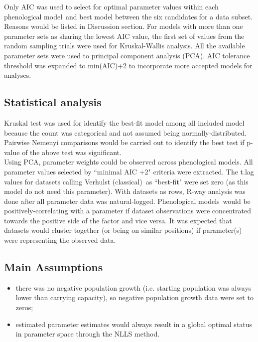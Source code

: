 \documentclass[a4paper, 11pt]{article}
\newcommand{\pml}{phenological model}
\newcommand{\pms}{phenological models}
\newcommand{\Pms}{Phenological models}
\newcommand{\fve}{Verhulst (classical)}
\begin{document}
	Only AIC\autocite{johnson2004model,akaike1998information,burnhamdr} was used to select for optimal parameter values within each \pml\ and best model between the six candidates for a data subset.  Reasons would be listed in Discussion section.  For models with more than one parameter sets as sharing the lowest AIC value, the first set of values from the random sampling trials were used for Kruskal-Wallis analysis.  All the available parameter sets were used to principal component analysis (PCA).  AIC tolerance threshold was expanded to min(AIC)+2\autocite{burnham2004multimodel} to incorporate more accepted models for analyses.
	
	\subsection*{Statistical analysis}
	Kruskal test was used for identify the best-fit model among all included model because the count was categorical and not assumed being normally-distributed.  Pairwise Nemenyi comparisons would be carried out to identify the best test if p-value of the above test was significant.\\
	
	Using PCA, parameter weights could be observed across \pms.  All parameter values selected by ``minimal AIC +2" criteria were extracted.  The t.lag values for datasets calling \fve\ as ``best-fit" were set zero (as this model do not need this parameter).  With datasets as rows, R-way analysis was done after all parameter data was natural-logged.  \Pms\ would be positively-correlating with a parameter if dataset observations were concentrated towards the positive side of the factor and vice versa.  It was expected that datasets would cluster together (or being on similar positions) if parameter(s) were representing the observed data.
	
	\subsection*{Main Assumptions}
	\begin{itemize}
		\item there was no negative population growth (i.e. starting population was always lower than carrying capacity), so negative population growth data were set to zeros;
		\item estimated parameter estimates would always result in a global optimal status in parameter space through the NLLS method.
	\end{itemize}
	
\end{document}
